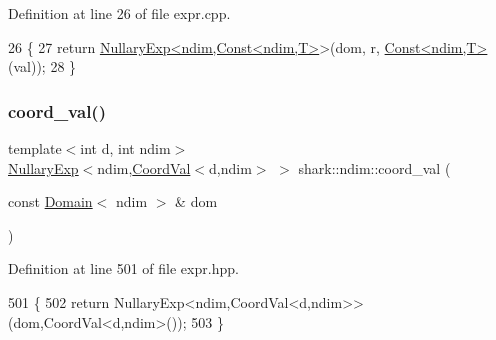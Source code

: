 Definition at line 26 of file expr.\+cpp.


\begin{DoxyCode}
26                                                                                                            
         \{
27     \textcolor{keywordflow}{return} \hyperlink{classshark_1_1ndim_1_1_nullary_exp}{NullaryExp<ndim,Const<ndim,T>}>(dom, r, 
      \hyperlink{classshark_1_1ndim_1_1_const}{Const<ndim,T>}(val));
28 \}
\end{DoxyCode}
\hypertarget{namespaceshark_1_1ndim_a599cfc303c9ba3f6fc3d6ddb2a13f541}{}\label{namespaceshark_1_1ndim_a599cfc303c9ba3f6fc3d6ddb2a13f541} 
\subsubsection{\texorpdfstring{coord\+\_\+val()}{coord\_val()}\hspace{0.1cm}{\footnotesize\ttfamily [1/3]}}
{\footnotesize\ttfamily template$<$int d, int ndim$>$ \\
\hyperlink{classshark_1_1ndim_1_1_nullary_exp}{Nullary\+Exp}$<$ndim,\hyperlink{classshark_1_1ndim_1_1_coord_val}{Coord\+Val}$<$d,ndim$>$ $>$ shark\+::ndim\+::coord\+\_\+val (\begin{DoxyParamCaption}\item[{const \hyperlink{classshark_1_1ndim_1_1_domain}{Domain}$<$ ndim $>$ \&}]{dom }\end{DoxyParamCaption})}



Definition at line 501 of file expr.\+hpp.


\begin{DoxyCode}
501                                                                              \{
502             \textcolor{keywordflow}{return} NullaryExp<ndim,CoordVal<d,ndim>>(dom,CoordVal<d,ndim>());
503         \}
\end{DoxyCode}
\hypertarget{namespaceshark_1_1ndim_a32dcb60d18d3a2fa6077d63ff7dcc60c}{}\label{namespaceshark_1_1ndim_a32dcb60d18d3a2fa6077d63ff7dcc60c} 
